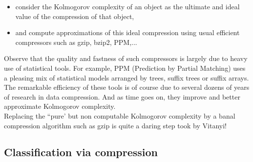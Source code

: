 \begin{enumerate}
\begin{itemize}
\item
consider the Kolmogorov complexity of an object
as the ultimate and ideal value of the compression of that object,
\item
and compute approximations of this ideal compression
using usual efficient compressors such as gzip, bzip2, PPM,...
\end{itemize}
Observe that the quality and fastness of such compressors
is largely due to heavy use of statistical tools.
For example, PPM (Prediction by Partial Matching) uses a pleasing
mix of statistical models arranged by trees, suffix trees
or suffix arrays.
The remarkable efficiency of these tools is of course due to
several dozens of years of research in data compression.
And as time goes on, they improve and better approximate
Kolmogorov complexity.
\\
Replacing the ``pure' but non computable Kolmogorov complexity
by a banal compression algorithm such as gzip
is quite a daring step took by Vitanyi!
\\
\end{enumerate}
\subsection{Classification via compression}
